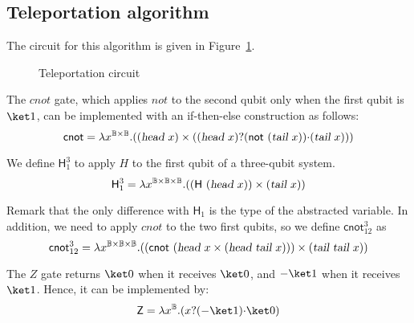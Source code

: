 \documentclass[preprint]{elsarticle}
\newcommand\B{\ensuremath{\mathbb B}}
\newcommand\ite[3]{{#1}?{#2}\mathord{\cdot}{#3}}
\newcommand\s[1]{\ensuremath{\mathsf{#1}}}
\newcommand\head{\text{\sl head}}
\newcommand\tail{\text{\sl tail}}
\begin{document}
\subsection{Teleportation algorithm}\label{ex:telep}

The circuit for this algorithm is given in Figure~\ref{fig:telep}.
\begin{figure}[t]
  \begin{center}
  \end{center}
  \caption{Teleportation circuit}
  \label{fig:telep}
\end{figure}

The $\mathit{cnot}$ gate, which applies $\mathit{not}$ to the second qubit only
when the first qubit is $\ket 1$, can be implemented with an if-then-else
construction as follows:
\[\s{cnot} = \lambda
  x^{\B\times\B}.((\head~x)\times(\ite{(\head~x)}{(\s{not}~(\tail~x))}{(\tail~x)}))\]

We define $\s H^3_1$ to apply $H$ to the first qubit of a three-qubit system.
\[\s H^3_1 =
  \lambda x^{\B\times\B\times\B}. ((\s H~(\head~x))\times(\tail~x))\]

Remark that the only difference with $\s H_1$ is the type of the abstracted
variable. In addition, we need to apply $cnot$ to the two first qubits, so we
define $\s{cnot}^3_{12}$ as
\[
  \s{cnot}^3_{12} = \lambda x^{\B\times\B\times\B}.
  ((\s{cnot}~(\head~x\times(\head~\tail~x)))\times (\tail~\tail~x))
\]

The $Z$ gate returns $\ket 0$ when it receives $\ket 0$, and $-\ket 1$ when it
receives $\ket 1$. Hence, it can be implemented by:
\[\s Z = \lambda x^{\B}.(\ite x{(-\ket 1)}{\ket 0})\]
\end{document}
